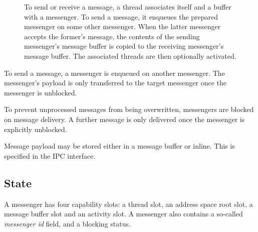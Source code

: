 \begin{figure}
  \centering

  \caption{To send or receive a message, a thread associates itself
    and a buffer with a messenger.  To send a message, it enqueues the
    prepared messenger on some other messenger.  When the latter
    messenger accepts the former's message, the contents of the
    sending messenger's message buffer is copied to the receiving
    messenger's message buffer.  The associated threads are then
    optionally activated.}
  \label{fig:sending-a-message}
\end{figure}

To send a message, a messenger is enqueued on another messenger.  The
messenger's payload is only transferred to the target messenger once
the messenger is unblocked.

To prevent unprocessed messages from being overwritten, messengers are
blocked on message delivery.  A further message is only delivered once
the messenger is explicitly unblocked.

Message payload may be stored either in a message buffer or inline.
This is specified in the IPC interface.

\subsection{State}

A messenger has four capability slots: a thread slot, an address space
root slot, a message buffer slot and an activity slot.  A messenger
also contains a so-called \emph{messenger id} field, and a blocking
status.

